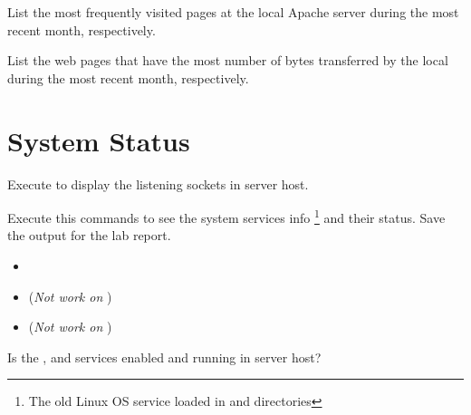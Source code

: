 \documentclass{../UTNetLab}
\begin{document}
\begin{report}
    \item List the most frequently visited pages at the local Apache server during the most recent month, respectively.

    \item List the web pages that have the most number of bytes transferred by the local during the most recent month, respectively.
\end{report}

\section{System Status}
Execute  to display the listening sockets in server host.

Execute this commands to see the system services info \footnote{The old Linux OS service loaded in and  directories} and their status.
Save the output for the lab report.
\begin{itemize}
    \item {}
    \item {} (\textit{Not work on} )
    \item {} (\textit{Not work on} )
\end{itemize}

\begin{report}
    \item Is the ,  and  services enabled and running in server host?
\end{report}
\end{document}

